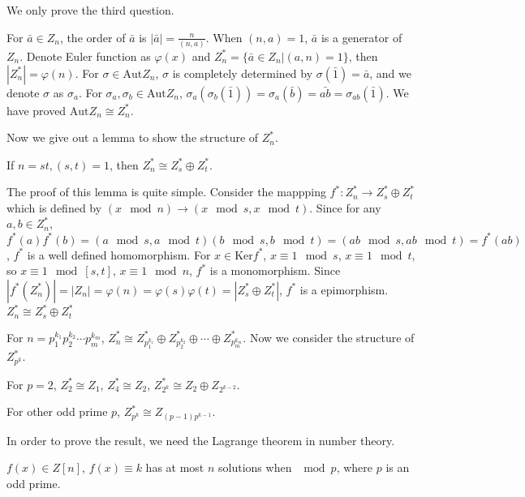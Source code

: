 \begin{answer}
    We only prove the third question.

    For $\bar{a}\in Z_{n}$, the order of $\bar{a}$ is $\left| \bar{a} \right|=\frac{n}{(n,a)}$. When $(n,a)=1$, $\bar{a}$ is a generator of $Z_{n}$. Denote Euler function as $\varphi(x)$ and $Z_{n}^{*}=\{\bar{a}\in Z_{n}|(a,n)=1\}$, then $\left| Z_{n}^{*} \right| =\varphi(n)$. For $\sigma \in \mathrm{Aut}Z_{n}$, $\sigma$ is completely determined by $\sigma(\bar{1})=\bar{a}$, and we denote $\sigma$ as $\sigma_{a}$. For $\sigma_{a},\sigma_{b}\in \mathrm{Aut}Z_{n}$, $\sigma_{a}(\sigma_{b}(\bar{1}))=\sigma_{a}(\bar{b})=\bar{ab}=\sigma_{ab}(\bar{1})$. We have proved $\mathrm{Aut}Z_{n}\cong Z_{n}^{*}$.

    Now we give out a lemma to show the structure of $Z_{n}^{*}$.
    \begin{lemma}
        If $n=st, (s,t)=1$, then $Z_{n}^{*}\cong Z_{s}^{*}\oplus Z_{t}^{*}$.
    \end{lemma}
    The proof of this lemma is quite simple. Consider the mappping $f^{*}: Z_{n}^{*}\to Z_{s}^{*}\oplus Z_{t}^{*}$ which is defined by $(x \mod n)\to (x\mod s, x\mod t)$. Since for any $a,b\in Z_{n}^{*}$, $f^{*}(a)f^*(b)=(a\mod s,a\mod t)(b\mod s,b\mod t)=(ab\mod s,ab\mod t)=f^{*}(ab)$, $f^{*}$ is a well defined homomorphism. For $x\in \mathrm{Ker}f^{*}$, $x\equiv 1\mod s$, $x\equiv 1\mod t$, so $x\equiv 1\mod \left[s,t\right]$, $x\equiv 1\mod n$, $f^{*}$ is a monomorphism. Since $\left| f^{*}(Z_{n}^{*}) \right|=\left| Z_{n} \right| =\varphi(n)=\varphi(s)\varphi(t)=\left| Z_{s}^{*}\oplus Z_{t}^{*} \right|$, $f^{*}$ is a epimorphism. $Z_{n}^{*}\cong Z_{s}^{*}\oplus Z_{t}^{*}$ 

    For $n=p_{1}^{k_{1}}p_{2}^{k_{2}}\cdots p_{m}^{k_{m}}$, $Z_{n}^{*}\cong Z_{p_{1}^{k_{1}}}^{*}\oplus Z_{p_{2}^{k_{2}}}^{*}\oplus\cdots\oplus Z_{p_{m}^{k_{m}}}^{*}$. Now we consider the structure of $Z_{p^{k}}^{*}$. 

    For $p=2$, $Z_{2}^{*}\cong Z_{1}$, $Z_{4}^{*}\cong Z_{2}$, $Z_{2^{k}}^{*}\cong Z_{2}\oplus Z_{2^{k-2}}$.

    For other odd prime $p$, $Z_{p^{k}}^{*}\cong Z_{(p-1)p^{k-1}}$.

    In order to prove the result, we need the Lagrange theorem in number theory.

    \begin{lemma}[Lagrange]
        $f(x)\in Z\left[n\right]$, $f(x)\equiv k$ has at most $n$ solutions when $\mod p$, where $p$ is an odd prime.
    \end{lemma}


\end{answer}

